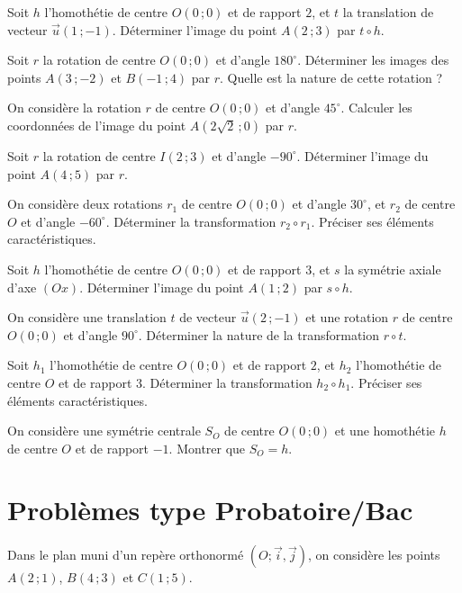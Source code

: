 \exo{}
Soit \(h\) l'homothétie de centre \(O(0\,; 0)\) et de rapport \(2\), et \(t\) la translation de vecteur \(\vec{u}(1\,; -1)\). Déterminer l'image du point \(A(2\,; 3)\) par \(t \circ h\).


\exo{}
Soit \(r\) la rotation de centre \(O(0\,; 0)\) et d'angle \(180^\circ\). Déterminer les images des points \(A(3\,; -2)\) et \(B(-1\,; 4)\) par \(r\). Quelle est la nature de cette rotation ?

\exo{}
On considère la rotation \(r\) de centre \(O(0\,; 0)\) et d'angle \(45^\circ\). Calculer les coordonnées de l'image du point \(A(2\sqrt{2}\,; 0)\) par \(r\).

\exo{}
Soit \(r\) la rotation de centre \(I(2\,; 3)\) et d'angle \(-90^\circ\). Déterminer l'image du point \(A(4\,; 5)\) par \(r\).

\exo{}
On considère deux rotations \(r_1\) de centre \(O(0\,; 0)\) et d'angle \(30^\circ\), et \(r_2\) de centre \(O\) et d'angle \(-60^\circ\). Déterminer la transformation \(r_2 \circ r_1\). Préciser ses éléments caractéristiques.


\exo{}
Soit \(h\) l'homothétie de centre \(O(0\,; 0)\) et de rapport \(3\), et \(s\) la symétrie axiale d'axe \((Ox)\). Déterminer l'image du point \(A(1\,; 2)\) par \(s \circ h\).

\exo{}
On considère une translation \(t\) de vecteur \(\vec{u}(2\,; -1)\) et une rotation \(r\) de centre \(O(0\,; 0)\) et d'angle \(90^\circ\). Déterminer la nature de la transformation \(r \circ t\).

\exo{}
Soit \(h_1\) l'homothétie de centre \(O(0\,; 0)\) et de rapport \(2\), et \(h_2\) l'homothétie de centre \(O\) et de rapport \(3\). Déterminer la transformation \(h_2 \circ h_1\). Préciser ses éléments caractéristiques.

\exo{}
On considère une symétrie centrale \(S_O\) de centre \(O(0\,; 0)\) et une homothétie \(h\) de centre \(O\) et de rapport \(-1\). Montrer que \(S_O = h\).

\section{Problèmes type Probatoire/Bac}

Dans le plan muni d'un repère orthonormé \((O; \vec{i}, \vec{j})\), on considère les points \(A(2\,; 1)\), \(B(4\,; 3)\) et \(C(1\,; 5)\).


